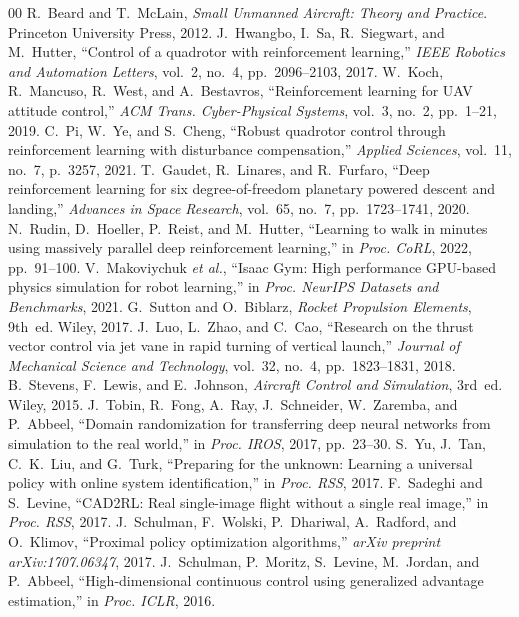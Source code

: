 \documentclass[conference]{IEEEtran}
\begin{document}
\begin{thebibliography}{00}
 R.~Beard and T.~McLain, \textit{Small Unmanned Aircraft: Theory and Practice}. Princeton University Press, 2012.
 J.~Hwangbo, I.~Sa, R.~Siegwart, and M.~Hutter, ``Control of a quadrotor with reinforcement learning,'' \textit{IEEE Robotics and Automation Letters}, vol.~2, no.~4, pp.~2096--2103, 2017.
 W.~Koch, R.~Mancuso, R.~West, and A.~Bestavros, ``Reinforcement learning for UAV attitude control,'' \textit{ACM Trans. Cyber-Physical Systems}, vol.~3, no.~2, pp.~1--21, 2019.
 C.~Pi, W.~Ye, and S.~Cheng, ``Robust quadrotor control through reinforcement learning with disturbance compensation,'' \textit{Applied Sciences}, vol.~11, no.~7, p.~3257, 2021.
 T.~Gaudet, R.~Linares, and R.~Furfaro, ``Deep reinforcement learning for six degree-of-freedom planetary powered descent and landing,'' \textit{Advances in Space Research}, vol.~65, no.~7, pp.~1723--1741, 2020.
 N.~Rudin, D.~Hoeller, P.~Reist, and M.~Hutter, ``Learning to walk in minutes using massively parallel deep reinforcement learning,'' in \textit{Proc. CoRL}, 2022, pp.~91--100.
 V.~Makoviychuk \textit{et al.}, ``Isaac Gym: High performance GPU-based physics simulation for robot learning,'' in \textit{Proc. NeurIPS Datasets and Benchmarks}, 2021.
 G.~Sutton and O.~Biblarz, \textit{Rocket Propulsion Elements}, 9th~ed. Wiley, 2017.
 J.~Luo, L.~Zhao, and C.~Cao, ``Research on the thrust vector control via jet vane in rapid turning of vertical launch,'' \textit{Journal of Mechanical Science and Technology}, vol.~32, no.~4, pp.~1823--1831, 2018.
 B.~Stevens, F.~Lewis, and E.~Johnson, \textit{Aircraft Control and Simulation}, 3rd~ed. Wiley, 2015.
 J.~Tobin, R.~Fong, A.~Ray, J.~Schneider, W.~Zaremba, and P.~Abbeel, ``Domain randomization for transferring deep neural networks from simulation to the real world,'' in \textit{Proc. IROS}, 2017, pp.~23--30.
 S.~Yu, J.~Tan, C.~K.~Liu, and G.~Turk, ``Preparing for the unknown: Learning a universal policy with online system identification,'' in \textit{Proc. RSS}, 2017.
 F.~Sadeghi and S.~Levine, ``CAD2RL: Real single-image flight without a single real image,'' in \textit{Proc. RSS}, 2017.
 J.~Schulman, F.~Wolski, P.~Dhariwal, A.~Radford, and O.~Klimov, ``Proximal policy optimization algorithms,'' \textit{arXiv preprint arXiv:1707.06347}, 2017.
 J.~Schulman, P.~Moritz, S.~Levine, M.~Jordan, and P.~Abbeel, ``High-dimensional continuous control using generalized advantage estimation,'' in \textit{Proc. ICLR}, 2016.

\end{thebibliography}
\end{document}
